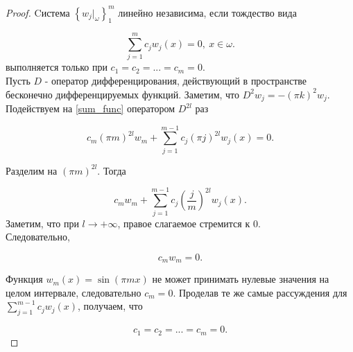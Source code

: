\begin{proof}
    Cистема $\left\{ w_j|_{\omega} \right\}^m_1$ линейно независима, если 
    тождество вида
    
    \begin{equation}\label{sum_func}
        \sum \limits_{j = 1}^m{c_j w_j(x)} = 0, \ x \in \omega.
    \end{equation}
    выполняется только при $c_1 = c_2 = ... = c_m = 0.$\\

    Пусть $D$ - оператор дифференцирования, действующий в пространстве бесконечно 
    дифференцируемых функций.
    Заметим, что $D^2 w_j = -(\pi k)^2 w_j$. Подействуем  на \eqref{sum_func} 
    оператором $D^{2l}$ раз

    \begin{equation*}
        c_m (\pi m)^{2l} w_m + \sum \limits_{j = 1}^{m - 1}{c_j (\pi j)^{2l}
        w_j(x)} = 0.
    \end{equation*}

    Разделим на $(\pi m)^{2l}$. Тогда

    \begin{equation*}
        c_m w_m + \sum \limits_{j = 1}^{m - 1}{c_j \left(\frac{j}{m}\right)^{2l}
        w_j(x)}.
    \end{equation*}
    Заметим, что при $l \rightarrow +\infty$, правое слагаемое стремится к 0.\\
    Следовательно,

    \begin{equation*}
        c_m w_m = 0.
    \end{equation*}

    Функция $w_m(x) = \sin{(\pi m x)}$ не может принимать нулевые значения на 
    целом интервале, следовательно $c_m = 0$. Проделав те же самые рассуждения 
    для $\sum \limits_{j = 1}^{m - 1}{c_j w_j(x)}$, получаем, что

    \begin{equation*}
        c_1 = c_2 = ... = c_m = 0.
    \end{equation*}

\end{proof}

\par
\vspace{2ex}

